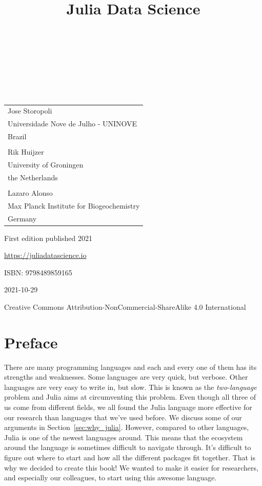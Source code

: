 \documentclass[
  notoc %
]{tufte-book}
\title{Julia Data Science}
\author{\noindent{Jose Storopoli}\\[3mm] \noindent{Rik
Huijzer}\\[3mm] \noindent{Lazaro Alonso}\\[3mm] }
\date{}
\begin{document}
\makeatletter
\thispagestyle{empty}
\vfill
{\Huge\bf
\noindent
\@title
}\\[1in]
{\Large
\noindent
\@author
}
\makeatother

\makeatletter
\newpage
\thispagestyle{empty}
\vfill
{\noindent
\begin{tabular}{l} Jose Storopoli\\ Universidade Nove de Julho - UNINOVE\\ Brazil\\ \\ Rik Huijzer\\ University of Groningen\\ the Netherlands\\ \\ Lazaro Alonso\\ Max Planck Institute for Biogeochemistry\\ Germany \end{tabular}
}
\vfill
{\small
First edition published 2021

\url{https://juliadatascience.io}

ISBN: 9798489859165

2021-10-29

Creative Commons Attribution-NonCommercial-ShareAlike 4.0 International
}
\makeatother


\frontmatter
\mainmatter

\setcounter{tocdepth}{1}
\tableofcontents

\justifying

\setlength{\parindent}{0pt}

\hypertarget{sec:preface}{%
\chapter{Preface}\label{sec:preface}}

There are many programming languages and each and every one of them has
its strengths and weaknesses. Some languages are very quick, but
verbose. Other languages are very easy to write in, but slow. This is
known as the \emph{two-language} problem and Julia aims at circumventing
this problem. Even though all three of us come from different fields, we
all found the Julia language more effective for our research than
languages that we've used before. We discuss some of our arguments in
Section~\ref{sec:why_julia}. However, compared to other languages, Julia
is one of the newest languages around. This means that the ecosystem
around the language is sometimes difficult to navigate through. It's
difficult to figure out where to start and how all the different
packages fit together. That is why we decided to create this book! We
wanted to make it easier for researchers, and especially our colleagues,
to start using this awesome language.
\end{document}
